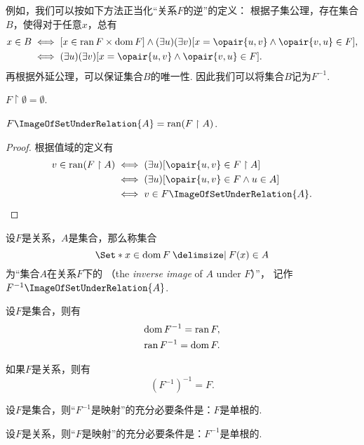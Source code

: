 例如，我们可以按如下方法正当化“关系\(F\)的逆”的定义：
根据子集公理，存在集合\(B\)，使得对于任意\(x\)，总有\begin{align*}
	x \in B
	&\iff
	[x \in \ran F \times \dom F]
	\land
	(\exists u)(\exists v)[x = \opair{u,v} \land \opair{v,u} \in F], \\
	&\iff
	(\exists u)(\exists v)[x = \opair{u,v} \land \opair{v,u} \in F].
\end{align*}
再根据外延公理，可以保证集合\(B\)的唯一性.
因此我们可以将集合\(B\)记为\(F^{-1}\).

\begin{theorem}
\(F \upharpoonright \emptyset = \emptyset\).
\end{theorem}

\begin{theorem}
\(F\ImageOfSetUnderRelation{A} = \ran(F \upharpoonright A)\).
\begin{proof}
根据值域的定义有\begin{align*}
	v \in \ran(F \upharpoonright A)
	&\iff
	(\exists u)[\opair{u,v} \in F \upharpoonright A] \\
	&\iff
	(\exists u)[\opair{u,v} \in F \land u \in A] \\
	&\iff
	v \in F\ImageOfSetUnderRelation{A}.
	\qedhere
\end{align*}
\end{proof}
\end{theorem}

\begin{definition}
设\(F\)是关系，\(A\)是集合，那么称集合\[
	\Set*{ x \in \dom F \given F(x) \in A }
\]为“集合\(A\)在关系\(F\)下的%
（the \emph{inverse image} of \(A\) under \(F\)）”，
记作\(F^{-1}\ImageOfSetUnderRelation{A}\).
\end{definition}

\begin{theorem}\label{theorem:集合论.关系的逆的定义域值域以及关系的二重逆}
设\(F\)是集合，则有\begin{gather}
	\operatorname{dom} F^{-1} = \operatorname{ran} F, \\
	\operatorname{ran} F^{-1} = \operatorname{dom} F.
\end{gather}

如果\(F\)是关系，则有\begin{equation}
	(F^{-1})^{-1} = F.
\end{equation}
\end{theorem}

\begin{theorem}\label{theorem:集合论.关系及其逆是映射的充分必要条件}
设\(F\)是集合，则“\(F^{-1}\)是映射”的充分必要条件是：\(F\)是单根的.

设\(F\)是关系，则“\(F\)是映射”的充分必要条件是：\(F^{-1}\)是单根的.
\end{theorem}


